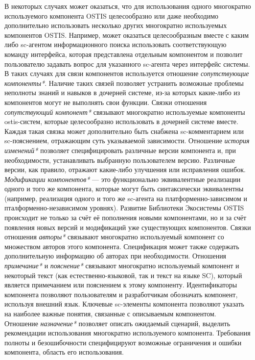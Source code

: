 В некоторых случаях может оказаться, что для использования одного многократно используемого компонента OSTIS целесообразно или даже необходимо дополнительно использовать несколько других многократно используемых компонентов OSTIS. Например, может оказаться целесообразным вместе с каким либо sc-агентом информационного поиска использовать соответствующую команду интерфейса, которая представлена отдельным компонентом и позволит пользователю задавать вопрос для указанного sc-агента через интерфейс системы. В таких случаях для связи компонентов используется отношение \textit{сопутствующие компоненты*}. Наличие таких связей позволяет устранить возможные проблемы неполноты знаний и навыков в дочерней системе, из-за которых какие-либо из компонентов могут не выполнять свои функции. Связки отношения \textit{сопутствующий компонент*} связывают многократно используемые компоненты ostis-систем, которые целесообразно использовать в дочерней системе вместе. Каждая такая связка может дополнительно быть снабжена sc-комментарием или sc-пояснением, отражающим суть указываемой зависимости. Отношение \textit{история изменений*} позволяет специфицировать различные версии компонента и, при необходимости, устанавливать выбранную пользователем версию. Различные версии, как правило, отражают какие-либо улучшения или исправления ошибок. \textit{Модификации компонентов*} --- это функционально эквивалентные реализации одного и того же компонента, которые могут быть синтаксически эквивалентны (например, реализация одного и того же sc-агента на платформенно-зависимом и пталформенно-независимом уровнях). Развитие Библиотеки Экосистемы OSTIS происходит не только за счёт её пополнения новыми компонентами, но и за счёт появления новых версий и модификаций уже существующих компонентов. Связки отношения \textit{авторы*} связывают многократно используемый компонент со множеством авторов этого компонента. Спецификация может также содержать дополнительную информацию об авторах при необходимости. Отношения \textit{примечание*} и \textit{пояснение*} связывают многократно используемый компонент и некоторый текст (как естественно-языковой, так и текст на языке SC), который является примечанием или пояснением к этому компоненту. Идентификаторы компонента позволяют пользователям и разработчикам обозначать компонент, используя внешний язык. Ключевые sc-элементы компонента позволяют указать на наиболее важные понятия, связанные с описываемым компонентом. Отношение \textit{назначение*} позволяет описать ожидаемый сценарий, выделить рекомендации использования многократно используемого компонента. Требования полноты и безошибочности специфицируют возможные ограничения и ошибки компонента, область его использования.

